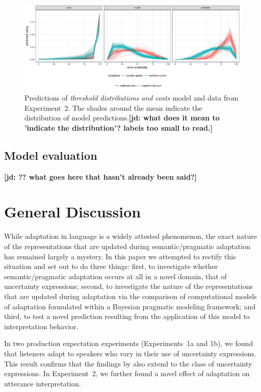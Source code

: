 \documentclass[lucida,biblatex]{sp} %
\newcommand{\jd}[1]{\textcolor{PinkyPurple}{\textbf{[jd: #1]}}}
\begin{document}
\begin{figure}
\includegraphics[width=\textwidth]{plots/adaptation-posterior-comp-data.pdf}
\caption{Predictions of \textit{threshold distributions and costs} model and data from Experiment~2. The shades around the mean indicate the distribution of model predictions.\jd{what does it mean to 'indicate the distribution'? labels too small to read.}  \label{fig:post-exposure-comp-data}}
\end{figure}

\subsection{Model evaluation}

\jd{?? what goes here that hasn't already been said?}

\section{General Discussion}

While adaptation in language is a widely attested phenomenon, the exact nature of the representations that are updated during semantic/pragmatic adaptation has remained largely a mystery. In this paper we attempted to rectify this situation and set out to do three things: first, to investigate whether semantic/pragmatic adaptation occurs at all in a novel domain, that of uncertainty expressions;  second, to investigate the nature of the representations that are updated during adaptation via the comparison of computational models of adaptation formulated within a Bayesian pragmatic modeling framework; and third, to test a novel prediction resulting from the application of this model to interpretation behavior.  

In two production expectation experiments (Experiments~1a and 1b), we found that listeners adapt to speakers who vary in their use of uncertainty expressions. This result confirms that 
the findings by \citet{Yildirim2016} also extend to the class of uncertainty expressions. In Experiment~2, we further found a novel effect of adaptation on utterance interpretation.
\end{document}
